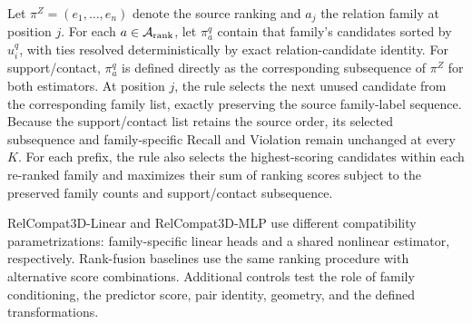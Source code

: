 \documentclass[letterpaper]{article}
\begin{document}
Let $\pi^Z=(e_1,\ldots,e_n)$ denote the source ranking and $a_j$ the relation family at position $j$. For each $a\in\mathcal A_{\rm rank}$, let $\pi_a^q$ contain that family's candidates sorted by $u_i^q$, with ties resolved deterministically by exact relation-candidate identity. For support/contact, $\pi_a^q$ is defined directly as the corresponding subsequence of $\pi^Z$ for both estimators. At position $j$, the rule selects the next unused candidate from the corresponding family list, exactly preserving the source family-label sequence. Because the support/contact list retains the source order, its selected subsequence and family-specific Recall and Violation remain unchanged at every $K$. For each prefix, the rule also selects the highest-scoring candidates within each re-ranked family and maximizes their sum of ranking scores subject to the preserved family counts and support/contact subsequence.

RelCompat3D-Linear and RelCompat3D-MLP use different compatibility parametrizations: family-specific linear heads and a shared nonlinear estimator, respectively. Rank-fusion baselines use the same ranking procedure with alternative score combinations. Additional controls test the role of family conditioning, the predictor score, pair identity, geometry, and the defined transformations.
\end{document}
